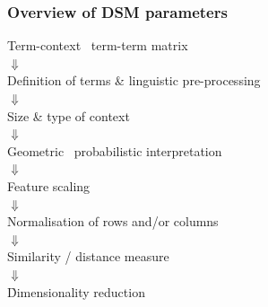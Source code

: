 \documentclass[t]{beamer} %
\begin{document}
\begin{frame}
  \frametitle{Overview of DSM parameters}

  \ungap[1]
  \begin{center}
    Term-context \vs\ term-term matrix\\
    $\Downarrow$\\
    Definition of terms \& linguistic pre-processing\\
    $\Downarrow$\\
    Size \& type of context\\
    $\Downarrow$\\
    Geometric \vs\ probabilistic interpretation\\
    $\Downarrow$\\
    Feature scaling\\
    $\Downarrow$\\
    Normalisation of rows and/or columns\\
    $\Downarrow$\\
    Similarity / distance measure\\
    $\Downarrow$\\
    \h{Dimensionality reduction}
  \end{center}
\end{frame}
\end{document}
